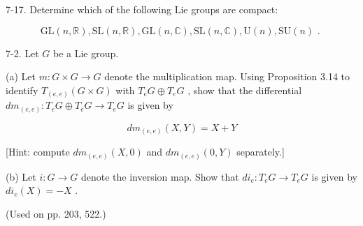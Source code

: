 \begin{exercise}
\label{prob:7-17}


7-17. Determine which of the following Lie groups are compact:

\[
\mathrm{{GL}}\left( {n,\mathbb{R}}\right) ,\mathrm{{SL}}\left( {n,\mathbb{R}}\right) ,\mathrm{{GL}}\left( {n,\mathbb{C}}\right) ,\mathrm{{SL}}\left( {n,\mathbb{C}}\right) ,\mathrm{U}\left( n\right) ,\mathrm{{SU}}\left( n\right) \text{ . }
\]
\end{exercise}

\begin{exercise}
\label{prob:7-2}


7-2. Let $G$ be a Lie group.

(a) Let $m : G \times  G \rightarrow  G$ denote the multiplication map. Using Proposition 3.14 to identify ${T}_{\left( e, e\right) }\left( {G \times  G}\right)$ with ${T}_{e}G \oplus  {T}_{e}G$ , show that the differential $d{m}_{\left( e, e\right) } : {T}_{e}G \oplus  {T}_{e}G \rightarrow  {T}_{e}G$ is given by

\[
d{m}_{\left( e, e\right) }\left( {X, Y}\right)  = X + Y
\]

[Hint: compute $d{m}_{\left( e, e\right) }\left( {X,0}\right)$ and $d{m}_{\left( e, e\right) }\left( {0, Y}\right)$ separately.]

(b) Let $i : G \rightarrow  G$ denote the inversion map. Show that $d{i}_{e} : {T}_{e}G \rightarrow  {T}_{e}G$ is given by $d{i}_{e}\left( X\right)  =  - X$ .

(Used on pp. 203, 522.)
\end{exercise}

